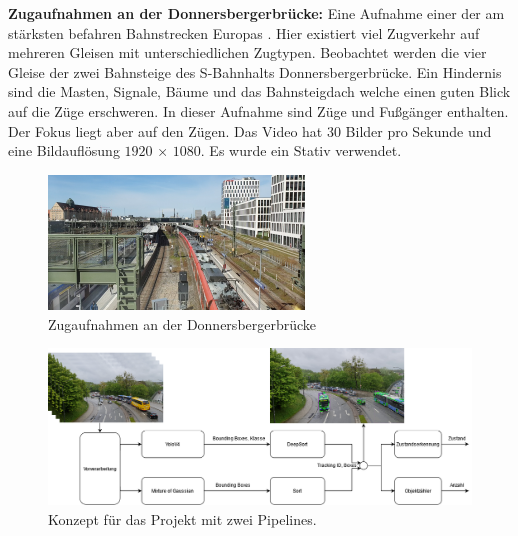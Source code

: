\documentclass[conference]{IEEEtran}
\begin{document}
	\textbf{Zugaufnahmen an der Donnersbergerbrücke:}
	Eine Aufnahme einer der am stärksten befahren Bahnstrecken Europas \cite{z1}. Hier existiert viel Zugverkehr auf mehreren Gleisen mit unterschiedlichen Zugtypen. Beobachtet werden die vier Gleise der zwei Bahnsteige des S-Bahnhalts Donnersbergerbrücke. Ein Hindernis sind die Masten, Signale, Bäume und das Bahnsteigdach welche einen guten Blick auf die Züge erschweren. In dieser Aufnahme sind Züge und Fußgänger enthalten. Der Fokus liegt aber auf den Zügen. Das Video hat 30 Bilder pro Sekunde und eine Bildauflösung $1920$ × $1080$. Es wurde ein Stativ verwendet.\\
	\begin{figure}[!h]
		\begin{center}
			\includegraphics[width=6.8cm]{Media/DonnersbergerRaw.png}
			\caption{Zugaufnahmen an der Donnersbergerbrücke}
			\label{DonnersbergerRaw}
		\end{center}
	\end{figure}
	
	\begin{figure}[!h]
		\begin{center}
			\includegraphics[width=16cm]{Media/KonzeptVAOT.png}
			\caption{Konzept für das Projekt mit zwei Pipelines.}
			\label{Konzept}
		\end{center}
	\end{figure}
	
\end{document}

